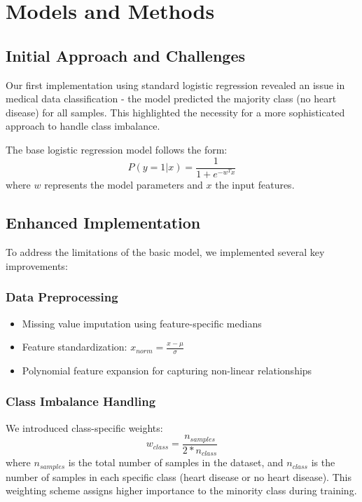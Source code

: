 \documentclass[10pt,conference,compsocconf]{IEEEtran}
\begin{document}
\section{Models and Methods}

\subsection{Initial Approach and Challenges}
Our first implementation using standard logistic regression revealed an issue in medical data
classification - the model predicted the majority class (no heart disease) for all samples.
This highlighted the necessity for a more sophisticated approach to handle
class imbalance.

The base logistic regression model follows the form:
\begin{equation}
    P(y=1|x) = \frac{1}{1 + e^{-w^Tx}}
\end{equation}
where $w$ represents the model parameters and $x$ the input features.

\subsection{Enhanced Implementation}
To address the limitations of the basic model, we implemented several key improvements:

\subsubsection{Data Preprocessing}
\begin{itemize}
    \item Missing value imputation using feature-specific medians
    \item Feature standardization: $x_{norm} = \frac{x - \mu}{\sigma}$
    \item Polynomial feature expansion for capturing non-linear relationships
\end{itemize}

\subsubsection{Class Imbalance Handling}
We introduced class-specific weights:
\begin{equation}
    w_{class} = \frac{n_{samples}}{2 * n_{class}}
\end{equation}
where $n_{samples}$ is the total number of samples in the dataset,
and $n_{class}$ is the number of samples in each specific class
(heart disease or no heart disease). This weighting scheme assigns higher
importance to the minority class during training.
\end{document}

